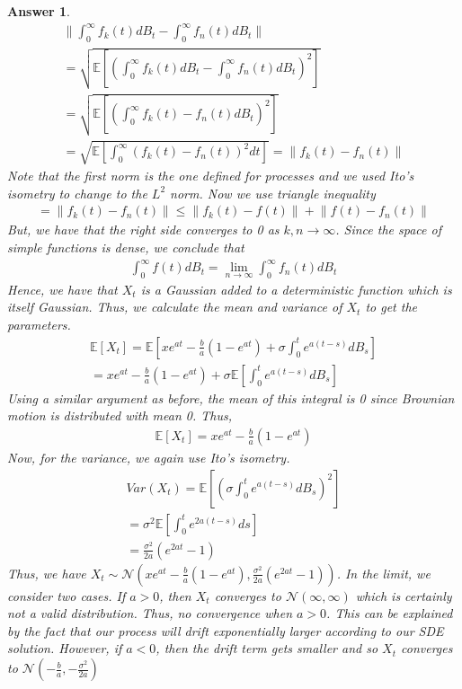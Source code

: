 \documentclass[12pt]{article}
\theoremstyle{colon}
\newtheorem*{answer}{Answer}
\begin{document}
\begin{answer}
  \begin{gather*}
    \lVert \int_0^\infty f_k(t) d B_t - \int_0^\infty f_n(t) d B_t \rVert \\
    = \sqrt{\mathbb{E} \left[ \left( \int_0^\infty f_k(t) d B_t - \int_0^\infty f_n(t) d B_t \right)^2 \right]} \\
    = \sqrt{\mathbb{E} \left[ \left( \int_0^\infty f_k(t) - f_n(t) d B_t \right)^2 \right]} \\
    = \sqrt{\mathbb{E} \left[ \int_0^\infty \left( f_k(t) - f_n(t) \right)^2 d t \right]}
    = \lVert f_k(t) - f_n(t) \rVert
  \end{gather*}
  Note that the first norm is the one defined for processes and we used Ito's isometry to change to the $L^2$ norm. Now we use triangle inequality
  \begin{gather*}
    = \lVert f_k(t) - f_n(t) \rVert \leq \lVert f_k(t) - f(t) \rVert + \lVert f(t) - f_n(t) \rVert
  \end{gather*}
  But, we have that the right side converges to 0 as $k,n \rightarrow \infty$. Since the space of simple functions is dense, we conclude that
  \begin{gather*}
    \int_0^\infty f(t) d B_t = \lim_{n \rightarrow \infty} \int_0^\infty f_n(t) d B_t
  \end{gather*}
  Hence, we have that $X_t$ is a Gaussian added to a deterministic function which is itself Gaussian. Thus, we calculate the mean and variance of $X_t$ to get the parameters.
  \begin{gather*}
    \mathbb{E}[X_t] = \mathbb{E} \left[ x e^{at} - \frac{b}{a}(1-e^{at}) + \sigma \int_0^t e^{a(t-s)} d B_s \right]\\
    = x e^{at} - \frac{b}{a}(1-e^{at}) + \sigma \mathbb{E} \left[ \int_0^t e^{a(t-s)} d B_s \right]
  \end{gather*}
  Using a similar argument as before, the mean of this integral is 0 since Brownian motion is distributed with mean 0. Thus,
  \begin{gather*}
    \mathbb{E}[X_t] = x e^{at} - \frac{b}{a}(1-e^{at})
  \end{gather*}
  Now, for the variance, we again use Ito's isometry.
  \begin{gather*}
    Var(X_t) = \mathbb{E} \left[ (\sigma \int_0^t e^{a(t-s)} d B_s)^2 \right] \\
    = \sigma^2 \mathbb{E} \left[ \int_0^t e^{2a(t-s)} ds \right] \\
    = \frac{\sigma^2}{2a} (e^{2at} - 1)
  \end{gather*}
  Thus, we have $X_t \sim \mathcal{N}(x e^{at} - \frac{b}{a}(1-e^{at}), \frac{\sigma^2}{2a} (e^{2at} - 1))$. In the limit, we consider two cases. If $a > 0$, then $X_t$ converges to $\mathcal{N}(\infty, \infty)$ which is certainly not a valid distribution. Thus, no convergence when $a > 0$. This can be explained by the fact that our process will drift exponentially larger according to our SDE solution. However, if $a < 0$, then the drift term gets smaller and so $X_t$ converges to $\mathcal{N}(-\frac{b}{a}, -\frac{\sigma^2}{2a})$
\end{answer}
\end{document}
